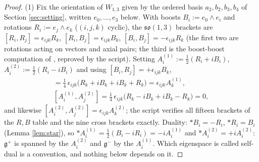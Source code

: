 \documentclass[11pt]{article}
\theoremstyle{definition}
\begin{document}
\begin{proof}
(1) Fix the orientation of $W_{1,3}$ given by the ordered basis $a_2, b_2, b_3, b_4$ of Section \ref{sec:setting}, written $e_0, \dots, e_3$ below. With boosts $B_i := e_0\wedge e_i$ and rotations $R_i := e_j\wedge e_k$ ($(i,j,k)$ cyclic), the $\mathfrak{so}(1,3)$ brackets are $[R_i, R_j] = \epsilon_{ijk}R_k$, $[R_i, B_j] = \epsilon_{ijk}B_k$, $[B_i, B_j] = -\epsilon_{ijk}R_k$ (the first two are rotations acting on vectors and axial pairs; the third is the boost-boost computation of \cite[Lem.~5.4]{ButlerT6}, reproved by the script). Setting $A^{(1)}_i := \tfrac12(R_i + iB_i)$, $A^{(2)}_i := \tfrac12(R_i - iB_i)$ and using $[B_i, R_j] = +\epsilon_{ijk}B_k$,
\begin{gather*}
[A^{(1)}_i, A^{(1)}_j] = \tfrac14\,\epsilon_{ijk}\bigl(R_k + iB_k + iB_k + R_k\bigr) = \epsilon_{ijk}A^{(1)}_k,\\
[A^{(1)}_i, A^{(2)}_j] = \tfrac14\,\epsilon_{ijk}\bigl(R_k - iB_k + iB_k - R_k\bigr) = 0,
\end{gather*}
and likewise $[A^{(2)}_i, A^{(2)}_j] = \epsilon_{ijk}A^{(2)}_k$; the script verifies all fifteen brackets of the $R, B$ table and the nine cross brackets exactly. Duality: $\ast B_i = -R_i$, $\ast R_i = B_i$ (Lemma \ref{lem:star}), so $\ast A^{(1)}_i = \tfrac12(B_i - iR_i) = -iA^{(1)}_i$ and $\ast A^{(2)}_i = +iA^{(2)}_i$: $\mathfrak{g}^+$ is spanned by the $A^{(2)}_i$ and $\mathfrak{g}^-$ by the $A^{(1)}_i$. Which eigenspace is called self-dual is a convention, and nothing below depends on it.

\end{proof}
\end{document}
